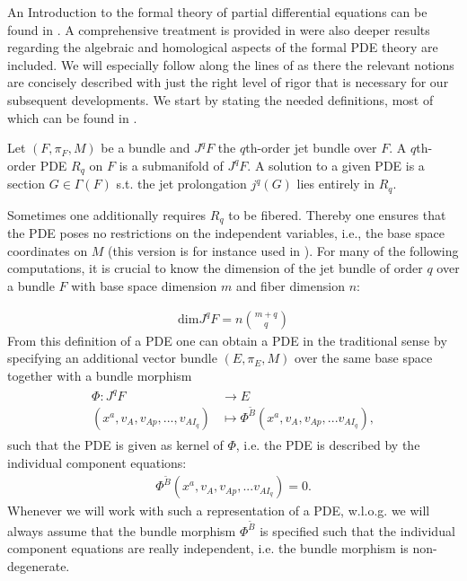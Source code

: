 An Introduction to the formal theory of partial differential equations can be found in \cite{saunders_1989}. A comprehensive treatment is provided in \cite{seiler2009involution} were also deeper results regarding the algebraic and homological aspects of the formal PDE theory are included. We will especially follow along the lines of \cite{seiler1994analysis} as there the relevant notions are concisely described with just the right level of rigor that is necessary for our subsequent developments. We start by stating the needed definitions, most of which can be found in \cite{seiler1994analysis}.
\begin{definition}[PDE]
Let $(F,\pi_F,M)$ be a bundle and $J^qF$ the $q$th-order jet bundle over $F$. A $q$th-order PDE $R_q$ on $F$ is a  submanifold of $J^qF$. A solution to a given PDE is a section $G \in \Gamma(F)$ s.t. the jet prolongation $j^q(G)$ lies entirely in $R_q$.  
\end{definition}
Sometimes one additionally requires $R_q$ to be fibered. Thereby one ensures that the PDE poses no restrictions on the independent variables, i.e., the base space coordinates on $M$ (this version is for instance used in \cite{seiler1994analysis}).
For many of the following computations, it is crucial to know the dimension of the jet bundle of order $q$ over a bundle $F$ with base space dimension $m$ and fiber dimension $n$:

\begin{align}
    \mathrm{dim}J^qF = n\binom{m+q}{q}
\end{align}
From this definition of a PDE one can obtain a PDE in the traditional sense by specifying an additional vector bundle $(E,\pi_E,M)$ over the same base space together with a bundle morphism
\begin{align}
    \begin{aligned}
    \Phi : J^qF &\longrightarrow E\\
    (x^a, v_A, v_{Ap},...,v_{AI_q}) &\longmapsto \Phi^{\tilde{B}}(x^a, v_A, v_{Ap},...v_{AI_q}),
    \end{aligned}
\end{align}
such that the PDE is given as kernel of $\Phi$, i.e.
the PDE is described by the individual component  equations:
\begin{align}
    \Phi^{\tilde{B}}(x^a, v_A, v_{Ap},...v_{AI_q}) = 0.
\end{align}
Whenever we will work with such a representation of a PDE, w.l.o.g. we will always assume that the bundle morphism $\Phi^{\tilde{B}}$ is specified such that the individual component equations are really independent, i.e. the bundle morphism is non-degenerate. 

